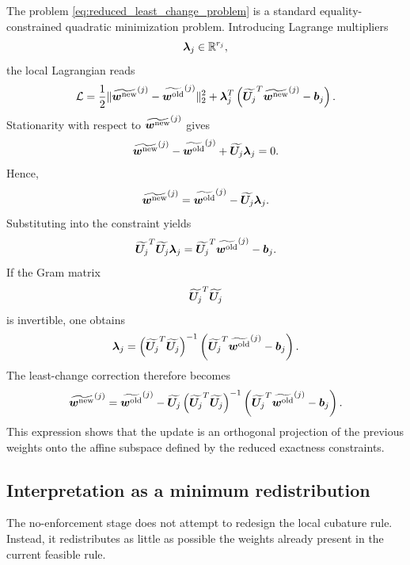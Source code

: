 \documentclass[11pt,a4paper]{article}
\begin{document}
The problem
\eqref{eq:reduced_least_change_problem} is a standard equality-constrained
quadratic minimization problem. Introducing Lagrange multipliers
\[
        \bm\lambda_j\in\mathbb{R}^{r_j},
\]
the local Lagrangian reads
\[
        \mathcal{L}
        =
        \frac{1}{2}
        \|
        \widetilde{\bm w^{\mathrm{new}}}^{(j)}
        -
        \widetilde{\bm w^{\mathrm{old}}}^{(j)}
        \|_2^2
        +
        \bm\lambda_j^T
        \left(
        \widetilde{\bm U_j}^T
        \widetilde{\bm w^{\mathrm{new}}}^{(j)}
        -
        \bm b_j
        \right).
\]
Stationarity with respect to
$\widetilde{\bm w^{\mathrm{new}}}^{(j)}$ gives
\[
        \widetilde{\bm w^{\mathrm{new}}}^{(j)}
        -
        \widetilde{\bm w^{\mathrm{old}}}^{(j)}
        +
        \widetilde{\bm U_j}\bm\lambda_j
        =
        0.
\]
Hence,
\[
        \widetilde{\bm w^{\mathrm{new}}}^{(j)}
        =
        \widetilde{\bm w^{\mathrm{old}}}^{(j)}
        -
        \widetilde{\bm U_j}\bm\lambda_j.
        \label{eq:no_enforcement_update}
\]
Substituting into the constraint yields
\[
        \widetilde{\bm U_j}^T
        \widetilde{\bm U_j}
        \bm\lambda_j
        =
        \widetilde{\bm U_j}^T
        \widetilde{\bm w^{\mathrm{old}}}^{(j)}
        -
        \bm b_j.
        \label{eq:no_enforcement_multiplier}
\]
If the Gram matrix
\[
        \widetilde{\bm U_j}^T\widetilde{\bm U_j}
\]
is invertible, one obtains
\[
        \bm\lambda_j
        =
        \left(
        \widetilde{\bm U_j}^T\widetilde{\bm U_j}
        \right)^{-1}
        \left(
        \widetilde{\bm U_j}^T
        \widetilde{\bm w^{\mathrm{old}}}^{(j)}
        -
        \bm b_j
        \right).
\]
The least-change correction therefore becomes
\[
        \widetilde{\bm w^{\mathrm{new}}}^{(j)}
        =
        \widetilde{\bm w^{\mathrm{old}}}^{(j)}
        -
        \widetilde{\bm U_j}
        \left(
        \widetilde{\bm U_j}^T\widetilde{\bm U_j}
        \right)^{-1}
        \left(
        \widetilde{\bm U_j}^T
        \widetilde{\bm w^{\mathrm{old}}}^{(j)}
        -
        \bm b_j
        \right).
        \label{eq:orthogonal_projection_update}
\]
This expression shows that the update is an orthogonal projection of the
previous weights onto the affine subspace defined by the reduced exactness
constraints.

\subsection{Interpretation as a minimum redistribution}

The no-enforcement stage does not attempt to redesign the local cubature rule.
Instead, it redistributes as little as possible the weights already present in
the current feasible rule.
\end{document}
